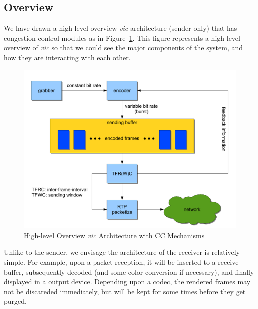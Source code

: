 
\subsection{\label{ssec:overview}Overview}

We have drawn a high-level overview \emph{vic} architecture (sender only) that
has congestion control modules as in Figure~\ref{fig:overview-arch}. This figure
represents a high-level overview of \emph{vic} so that we could see the major
components of the system, and how they are interacting with each other. 

\vspace{1cm}

\begin{figure}[!h]
\begin{center}
\includegraphics[scale=.5]{./img/proposed-vic-arch}
\caption{\label{fig:overview-arch}High-level Overview \emph{vic} Architecture 
with CC Mechanisms}
\end{center}
\end{figure}

Unlike to the sender, we envisage the architecture of the receiver is relatively
simple. For example, upon a packet reception, it will be inserted to a receive
buffer, subsequently decoded (and some color conversion if necessary), and
finally displayed in a output device. Depending upon a codec, the rendered
frames may not be discareded immediately, but will be kept for some times before
they get purged.

\newpage
